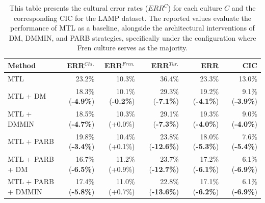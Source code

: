 %
%
\begin{table} [H]
\centering
\scriptsize
\begin{tabular}{lrrrrr}
\toprule
\textbf{Method} & \textbf{ERR$^{Chi.}$} & \textbf{ERR$^{Fren.}$} & \textbf{ERR$^{Tur.}$} & \textbf{ERR} & \textbf{CIC} \\
\midrule							
MTL          & 23.2\% & 10.3\% & 36.4\% & 23.3\% & 13.0\% \\
MTL +  DM    & 18.3\% (\textbf{-4.9\%}) & 10.1\% (\textbf{-0.2\%}) & 29.3\% (\textbf{-7.1\%}) & 19.2\% (\textbf{-4.1\%}) & 9.1\% (\textbf{-3.9\%}) \\
MTL +  DMMIN & 18.5\% (\textbf{-4.7\%}) & 10.3\% (+0.0\%) & 29.1\% (\textbf{-7.3\%}) & 19.3\% (\textbf{-4.0\%}) & 9.0\% (\textbf{-4.0\%}) \\
\hline
MTL + PARB     & 19.8\% (\textbf{-3.4\%}) & 10.4\% (+0.1\%) & 23.8\% (\textbf{-12.6\%}) & 18.0\% (\textbf{-5.3\%}) & 7.6\% (\textbf{-5.4\%}) \\
MTL + PARB + DM & 16.7\% (\textbf{-6.5\%}) & 11.2\% (+0.9\%) & 23.7\% (\textbf{-12.7\%}) & 17.2\% (\textbf{-6.1\%}) & 6.1\% (\textbf{-6.9\%}) \\
MTL + PARB + DMMIN & 17.4\% (\textbf{-5.8\%}) & 11.0\% (+0.7\%) & 22.8\% (\textbf{-13.6\%}) & 17.1\% (\textbf{-6.2\%}) & 6.1\% (\textbf{-6.9\%}) \\
\bottomrule
\end{tabular}
\caption{This table presents the cultural error rates ($ERR^C$) for each culture $C$ and the corresponding CIC for the LAMP dataset. The reported values evaluate the performance of MTL as a baseline, alongside the architectural interventions of DM, DMMIN, and PARB strategies, specifically under the configuration where Fren culture serves as the majority.}
\label{ch3:tab:mtl_and_da:LF}
\end{table}
%
%
